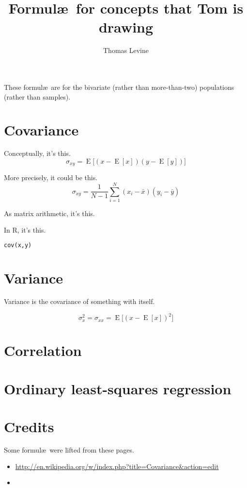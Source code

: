 \documentclass{article}
\title{Formul\ae\ for concepts that Tom is drawing}
\author{Thomas Levine}
\begin{document}
\maketitle

These formul\ae\ are for the bivariate (rather than more-than-two) populations (rather than samples).

\section{Covariance}
Conceptually, it's this.
$$\sigma_{xy} = \operatorname{E}{\big[(x - \operatorname{E}[x])(y - \operatorname{E}[y])\big]} $$

More precisely, it could be this.
$$\sigma_{xy} = \frac{1}{N-1}\sum_{i=1}^{N}\left( x_{i}-\bar{x} \right) \left( y_{i}-\bar{y} \right) $$

As matrix arithmetic, it's this.

In R, it's this.

\begin{verbatim}
cov(x,y)
\end{verbatim}

\section{Variance}
Variance is the covariance of something with itself.

$$ \sigma_{x}^2 = \sigma_{xx} = \operatorname{E}{\big[\left(x - \operatorname{E}[x]\right)^2\big]} $$

\section{Correlation}
\section{Ordinary least-squares regression}

\section{Credits}
Some formul\ae\ were lifted from these pages.
\begin{itemize}
\item \url{http://en.wikipedia.org/w/index.php?title=Covariance&action=edit}
\item \url{}
\end{itemize}
\end{document}
